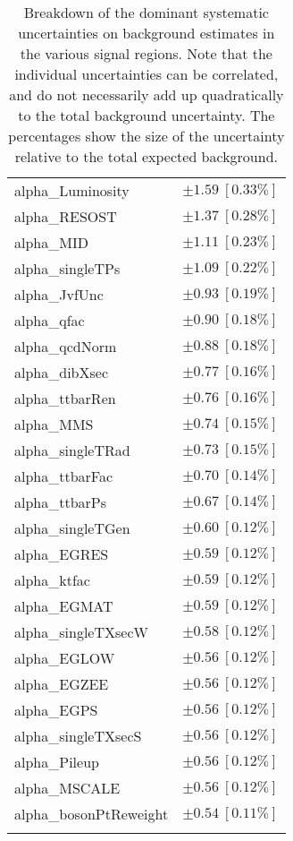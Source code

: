\begin{table}
\begin{center}
\begin{tabular*}{\textwidth}{@{\extracolsep{\fill}}lc}
alpha\_Luminosity         & $\pm 1.59\ [0.33\%] $       \\
alpha\_RESOST         & $\pm 1.37\ [0.28\%] $       \\
alpha\_MID         & $\pm 1.11\ [0.23\%] $       \\
alpha\_singleTPs         & $\pm 1.09\ [0.22\%] $       \\
alpha\_JvfUnc         & $\pm 0.93\ [0.19\%] $       \\
alpha\_qfac         & $\pm 0.90\ [0.18\%] $       \\
alpha\_qcdNorm         & $\pm 0.88\ [0.18\%] $       \\
alpha\_dibXsec         & $\pm 0.77\ [0.16\%] $       \\
alpha\_ttbarRen         & $\pm 0.76\ [0.16\%] $       \\
alpha\_MMS         & $\pm 0.74\ [0.15\%] $       \\
alpha\_singleTRad         & $\pm 0.73\ [0.15\%] $       \\
alpha\_ttbarFac         & $\pm 0.70\ [0.14\%] $       \\
alpha\_ttbarPs         & $\pm 0.67\ [0.14\%] $       \\
alpha\_singleTGen         & $\pm 0.60\ [0.12\%] $       \\
alpha\_EGRES         & $\pm 0.59\ [0.12\%] $       \\
alpha\_ktfac         & $\pm 0.59\ [0.12\%] $       \\
alpha\_EGMAT         & $\pm 0.59\ [0.12\%] $       \\
alpha\_singleTXsecW         & $\pm 0.58\ [0.12\%] $       \\
alpha\_EGLOW         & $\pm 0.56\ [0.12\%] $       \\
alpha\_EGZEE         & $\pm 0.56\ [0.12\%] $       \\
alpha\_EGPS         & $\pm 0.56\ [0.12\%] $       \\
alpha\_singleTXsecS         & $\pm 0.56\ [0.12\%] $       \\
alpha\_Pileup         & $\pm 0.56\ [0.12\%] $       \\
alpha\_MSCALE         & $\pm 0.56\ [0.12\%] $       \\
alpha\_bosonPtReweight         & $\pm 0.54\ [0.11\%] $       \\
\noalign{\smallskip}\hline\noalign{\smallskip}
\end{tabular*}
\end{center}
\caption[Breakdown of uncertainty on background estimates]{
Breakdown of the dominant systematic uncertainties on background estimates in the various signal regions.
Note that the individual uncertainties can be correlated, and do not necessarily add up quadratically to 
the total background uncertainty. The percentages show the size of the uncertainty relative to the total expected background.
\label{table.results.bkgestimate.uncertainties.SR}}
\end{table}
%